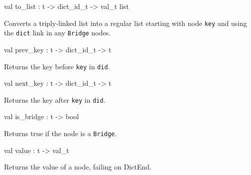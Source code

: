 \documentclass[11pt]{article}
\begin{document}
\label{val:Key.to-underscorelist}\begin{ocamldoccode}
val to_list : t -> dict_id_t -> val_t list
\end{ocamldoccode}
\begin{ocamldocdescription}
Converts a triply-linked list into a regular list starting with node
    {\tt{key}} and using the {\tt{dict}} link in any {\tt{Bridge}} nodes.


\end{ocamldocdescription}




\label{val:Key.prev-underscorekey}\begin{ocamldoccode}
val prev_key : t -> dict_id_t -> t
\end{ocamldoccode}
\begin{ocamldocdescription}
Returns the key before {\tt{key}} in {\tt{did}}.


\end{ocamldocdescription}




\label{val:Key.next-underscorekey}\begin{ocamldoccode}
val next_key : t -> dict_id_t -> t
\end{ocamldoccode}
\begin{ocamldocdescription}
Returns the key after {\tt{key}} in {\tt{did}}.


\end{ocamldocdescription}




\label{val:Key.is-underscorebridge}\begin{ocamldoccode}
val is_bridge : t -> bool
\end{ocamldoccode}
\begin{ocamldocdescription}
Returns true if the node is a {\tt{Bridge}}.


\end{ocamldocdescription}




\label{val:Key.value}\begin{ocamldoccode}
val value : t -> val_t
\end{ocamldoccode}
\begin{ocamldocdescription}
Returns the value of a node, failing on DictEnd.


\end{ocamldocdescription}
\end{document}
